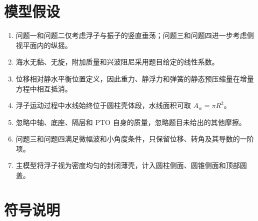 \documentclass[withoutpreface]{../../../templates/CUMCM2026-Complete-LaTeX/cumcmthesis}
\begin{document}
\section{模型假设}

\begin{enumerate}[leftmargin=3.2em]
  \item 问题一和问题二仅考虑浮子与振子的竖直垂荡；问题三和问题四进一步考虑侧视平面内的纵摇。
  \item 海水无黏、无旋，附加质量和兴波阻尼采用题目给定的线性系数。
  \item 位移相对静水平衡位置定义，因此重力、静浮力和弹簧的静态预压缩量在增量方程中相互抵消。
  \item 浮子运动过程中水线始终位于圆柱壳体段，水线面积可取 $A_w=\pi R^2$。
  \item 忽略中轴、底座、隔层和 PTO 自身的质量，忽略题目未给出的其他摩擦。
  \item 问题三和问题四满足微幅波和小角度条件，只保留位移、转角及其导数的一阶项。
  \item 主模型将浮子视为密度均匀的封闭薄壳，计入圆柱侧面、圆锥侧面和顶部圆盖。
\end{enumerate}

\section{符号说明}
\end{document}
